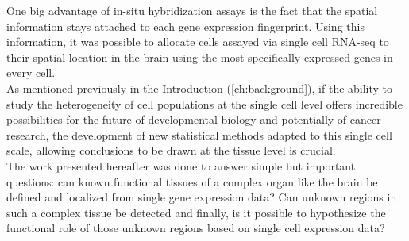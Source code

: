 One big advantage of in-situ hybridization assays is the fact that the spatial information stays attached to each gene expression fingerprint. Using this information, it was possible to allocate cells assayed via single cell RNA-seq to their spatial location in the brain using the most specifically expressed genes in every cell. \\

As mentioned previously in the Introduction (\ref{ch:background}), if the ability to study the heterogeneity of cell populations at the single cell level offers incredible possibilities for the future of developmental biology and potentially of cancer research, the development of new statistical methods adapted to this single cell scale, allowing conclusions to be drawn at the tissue level is crucial.\\

The work presented hereafter was done to answer simple but important questions: can known functional tissues of a complex organ like the brain be defined and localized from single gene expression data? Can unknown regions in such a complex tissue be detected and finally, is it possible to hypothesize the functional role of those unknown regions based on single cell expression data?


	
	



